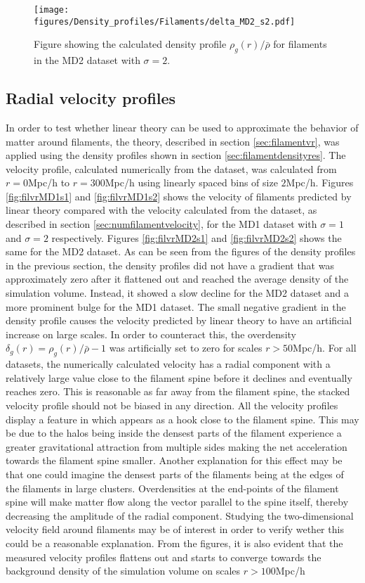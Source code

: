 \begin{figure}[H]
    \texttt{[image: figures/Density\_profiles/Filaments/delta\_MD2\_s2.pdf]}
    \caption{Figure showing the calculated density profile $\rho_g(r)/\bar{\rho}$ for filaments in the MD2 dataset with $\sigma=2$.}
    \label{fig:fildensitytMD2s2}
\end{figure}
\subsection{Radial velocity profiles}
In order to test whether linear theory can be used to approximate the behavior of matter around filaments, the theory, described in section \ref{sec:filamentvr}, was applied using the density profiles shown in section \ref{sec:filamentdensityres}. The velocity profile, calculated numerically from the dataset, was calculated from $r=0$Mpc/h to $r=300$Mpc/h using linearly spaced bins of size $2$Mpc/h. Figures \ref{fig:filvrMD1s1} and \ref{fig:filvrMD1s2} shows the velocity of filaments predicted by linear theory compared with the velocity calculated from the dataset, as described in section \ref{sec:numfilamentvelocity}, for the MD1 dataset with $\sigma=1$ and $\sigma=2$ respectively. Figures \ref{fig:filvrMD2s1} and \ref{fig:filvrMD2s2} shows the same for the MD2 dataset. As can be seen from the figures of the density profiles in the previous section, the density profiles did not have a gradient that was approximately zero after it flattened out and reached the average density of the simulation volume. Instead, it showed a slow decline for the MD2 dataset and a more prominent bulge for the MD1 dataset. The small negative gradient in the density profile causes the velocity predicted by linear theory to have an artificial increase on large scales. In order to counteract this, the overdensity $\delta_g(r)=\rho_g(r)/\bar{\rho}-1$ was artificially set to zero for scales $r>50$Mpc/h. For all datasets, the numerically calculated velocity has a radial component with a relatively large value close to the filament spine before it declines and eventually reaches zero. This is reasonable as far away from the filament spine, the stacked velocity profile should not be biased in any direction. All the velocity profiles display a feature in which appears as a hook close to the filament spine. This may be due to the halos being inside the densest parts of the filament experience a greater gravitational attraction from multiple sides making the net acceleration towards the filament spine smaller. Another explanation for this effect may be that one could imagine the densest parts of the filaments being at the edges of the filaments in large clusters. Overdensities at the end-points of the filament spine will make matter flow along the vector parallel to the spine itself, thereby decreasing the amplitude of the radial component. Studying the two-dimensional velocity field around filaments may be of interest in order to verify wether this could be a reasonable explanation. From the figures, it is also evident that the measured velocity profiles flattens out and starts to converge towards the background density of the simulation volume on scales $r>100$Mpc/h \\\indent
